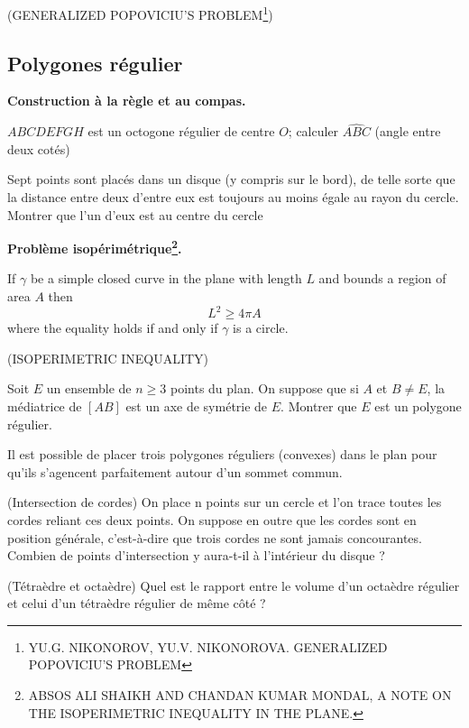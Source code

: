 \begin{exercise}{(GENERALIZED POPOVICIU’S PROBLEM\footnote{YU.G. NIKONOROV, YU.V. NIKONOROVA. GENERALIZED POPOVICIU’S PROBLEM})}
\end{exercise}
\subsection{Polygones régulier}

\begin{definition}
\end{definition}

\textbf{Construction à la règle et au compas.}
\\
\begin{example}
$ABCDEFGH$ est un octogone régulier de centre $O$; calculer $\widehat{ABC}$ (angle entre deux cotés)
\end{example}

\begin{example}
Sept points sont placés dans un disque (y compris sur le bord), de telle sorte que la
distance entre deux d’entre eux est toujours au moins égale au rayon du cercle. Montrer que
l’un d’eux est au centre du cercle
\end{example}

\textbf{Problème isopérimétrique\footnote{ABSOS ALI SHAIKH AND CHANDAN KUMAR MONDAL, A NOTE ON THE ISOPERIMETRIC INEQUALITY IN THE PLANE.}.}
\\
\begin{theorem}
If $\gamma$ be a simple closed curve in the plane with length $L$ and bounds a region of area $A$ then
\[
L^{2} \geq 4 \pi A
\]
where the equality holds if and only if $\gamma$ is a circle.
\end{theorem}

\begin{example}{(ISOPERIMETRIC INEQUALITY)}
\end{example}

\begin{exercise}
Soit $E$ un ensemble de $n \geq 3$ points du plan. On suppose que si $A$ et $B \neq E$, la médiatrice
de $\left[AB\right]$ est un axe de symétrie de $E$. Montrer que $E$ est un polygone régulier.
\end{exercise}

\begin{exercise}
Il est possible de placer trois polygones réguliers (convexes) dans le plan pour qu'ils s'agencent parfaitement autour d'un sommet commun.
\end{exercise}

\begin{exercise}{(Intersection de cordes)}
On place n points sur un cercle et l’on trace toutes les cordes reliant ces deux points. On
suppose en outre que les cordes sont en position générale, c’est-à-dire que trois cordes ne
sont jamais concourantes. Combien de points d’intersection y aura-t-il à l’intérieur du disque ?
\end{exercise}

\begin{exercise}{(Tétraèdre et octaèdre)}
Quel est le rapport entre le volume d'un octaèdre régulier et celui d'un tétraèdre régulier de même côté ?
\end{exercise}
